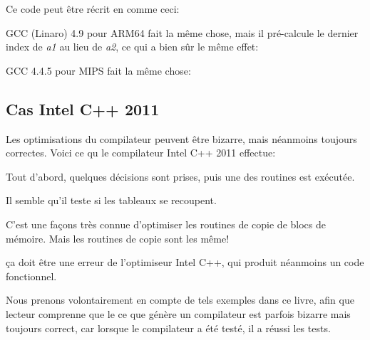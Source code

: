 Ce code peut être récrit en \CCpp comme ceci:



GCC (Linaro) 4.9 pour ARM64 fait la même chose, mais il pré-calcule le dernier index
de \emph{a1} au lieu de \emph{a2}, ce qui a bien sûr le même effet:




GCC 4.4.5 pour MIPS fait la même chose:



\subsection{Cas Intel C++ 2011}
\myindex{\CompilerAnomaly}
\label{loops_iterators_loop_anomaly}

Les optimisations du compilateur peuvent être bizarre, mais néanmoins toujours correctes.
Voici ce qu le compilateur Intel C++ 2011 effectue:



Tout d'abord, quelques décisions sont prises, puis une des routines est exécutée.

Il semble qu'il teste si les tableaux se recoupent.

C'est une façons très connue d'optimiser les routines de copie de blocs de mémoire.
Mais les routines de copie sont les même!

ça doit être une erreur de l'optimiseur Intel C++, qui produit néanmoins un code
fonctionnel.

Nous prenons volontairement en compte de tels exemples dans ce livre, afin que lecteur
comprenne que le ce que génère un compilateur est parfois bizarre mais toujours correct,
car lorsque le compilateur a été testé, il a réussi les tests.
